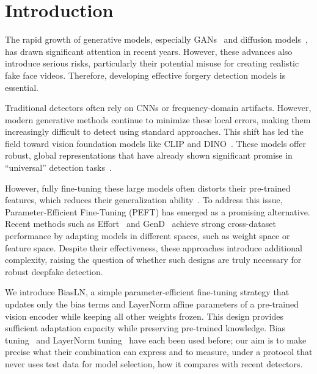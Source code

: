 \documentclass[fonts]{icst}
\newif\ifrevmark\revmarktrue
\newcommand{\rev}[1]{\ifrevmark{\color{revblue}#1}\else#1\fi}
\begin{document}
\maketitle

\section{Introduction}
The rapid growth of generative models, especially GANs~\cite{goodfellow2020gan} and diffusion models~\cite{yang2022diffusion}, has drawn significant attention in recent years. However, these advances also introduce serious risks, particularly their potential misuse for creating realistic fake face videos. Therefore, developing effective forgery detection models is essential.

Traditional detectors often rely on CNNs or frequency-domain artifacts. However, modern generative methods continue to minimize these local errors, making them increasingly difficult to detect using standard approaches.
This shift has led the field toward vision foundation models like CLIP and DINO~\cite{radford2021clip_vitl,caron2021emerging}.
These models offer robust, global representations that have already shown significant promise in ``universal'' detection tasks~\cite{ojha2023universal}.

However, fully fine-tuning these large models often \rev{distorts their pre-trained features}, which reduces their generalization ability~\cite{kumar2022finetuning}.
To address this issue, Parameter-Efficient Fine-Tuning (PEFT) has emerged as a promising alternative. Recent methods such as Effort~\cite{yan2025effort} and GenD~\cite{yermakov2025gend} achieve strong cross-dataset performance by adapting models in different spaces, such as weight space or feature space.
Despite their effectiveness, these approaches introduce additional complexity, raising the question of whether such designs are truly necessary for robust deepfake detection.

We introduce BiasLN, a simple parameter-efficient fine-tuning strategy that updates only the bias terms and LayerNorm affine parameters of a pre-trained vision encoder while keeping all other weights frozen. This design provides sufficient adaptation capacity while preserving pre-trained knowledge. \rev{Bias tuning~\cite{benzaken2022bitfit} and LayerNorm tuning~\cite{wang2022ln,yermakov2025gend} have each been used before; our aim is to make precise what their combination can express and to measure, under a protocol that never uses test data for model selection, how it compares with recent detectors.}
\end{document}

